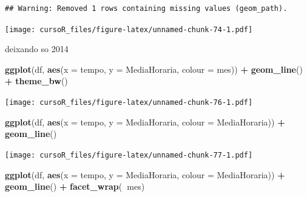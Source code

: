 \documentclass[]{book}
\newenvironment{Shaded}{\begin{snugshade}}{\end{snugshade}}
\newcommand{\KeywordTok}[1]{\textcolor[rgb]{0.13,0.29,0.53}{\textbf{#1}}}
\newcommand{\DataTypeTok}[1]{\textcolor[rgb]{0.13,0.29,0.53}{#1}}
\newcommand{\DecValTok}[1]{\textcolor[rgb]{0.00,0.00,0.81}{#1}}
\newcommand{\StringTok}[1]{\textcolor[rgb]{0.31,0.60,0.02}{#1}}
\newcommand{\OperatorTok}[1]{\textcolor[rgb]{0.81,0.36,0.00}{\textbf{#1}}}
\newcommand{\NormalTok}[1]{#1}
\begin{document}
\begin{verbatim}
## Warning: Removed 1 rows containing missing values (geom_path).
\end{verbatim}

\texttt{[image: cursoR\_files/figure-latex/unnamed-chunk-74-1.pdf]}

deixando so 2014

\begin{Shaded}
\end{Shaded}

\begin{Shaded}
\begin{Highlighting}[]
\KeywordTok{ggplot}\NormalTok{(df, }\KeywordTok{aes}\NormalTok{(}\DataTypeTok{x =}\NormalTok{ tempo, }\DataTypeTok{y =}\NormalTok{ MediaHoraria, }\DataTypeTok{colour =}\NormalTok{ mes)) }\OperatorTok{+}\StringTok{ }
\StringTok{  }\KeywordTok{geom_line}\NormalTok{() }\OperatorTok{+}
\StringTok{  }\KeywordTok{theme_bw}\NormalTok{()}
\end{Highlighting}
\end{Shaded}

\texttt{[image: cursoR\_files/figure-latex/unnamed-chunk-76-1.pdf]}

\begin{Shaded}
\begin{Highlighting}[]
\KeywordTok{ggplot}\NormalTok{(df, }\KeywordTok{aes}\NormalTok{(}\DataTypeTok{x =}\NormalTok{ tempo, }\DataTypeTok{y =}\NormalTok{ MediaHoraria, }\DataTypeTok{colour =}\NormalTok{ MediaHoraria)) }\OperatorTok{+}\StringTok{ }
\StringTok{  }\KeywordTok{geom_line}\NormalTok{() }
\end{Highlighting}
\end{Shaded}

\texttt{[image: cursoR\_files/figure-latex/unnamed-chunk-77-1.pdf]}

\begin{Shaded}
\begin{Highlighting}[]
\KeywordTok{ggplot}\NormalTok{(df, }\KeywordTok{aes}\NormalTok{(}\DataTypeTok{x =}\NormalTok{ tempo, }\DataTypeTok{y =}\NormalTok{ MediaHoraria, }\DataTypeTok{colour =}\NormalTok{ MediaHoraria)) }\OperatorTok{+}\StringTok{ }
\StringTok{  }\KeywordTok{geom_line}\NormalTok{() }\OperatorTok{+}
\StringTok{  }\KeywordTok{facet_wrap}\NormalTok{(}\OperatorTok{~}\NormalTok{mes)}
\end{Highlighting}
\end{Shaded}
\end{document}
